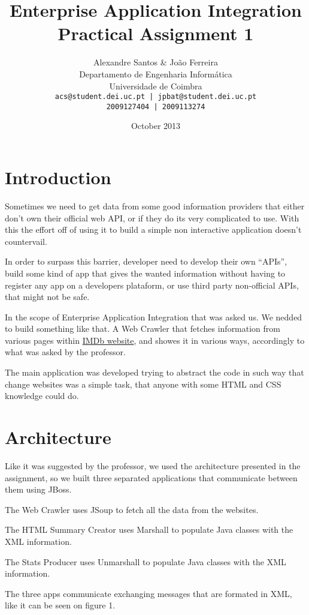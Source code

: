 \documentclass[a4paper]{article}
\title{Enterprise Application Integration \\ Practical Assignment 1}
\author{Alexandre Santos \& João Ferreira\\
		Departamento de Engenharia Informática\\
		Universidade de Coimbra\\
		\texttt{acs@student.dei.uc.pt | jpbat@student.dei.uc.pt}\\
		\texttt{2009127404 | 2009113274}}
\date{October 2013}
\begin{document}
\maketitle

\clearpage

\tableofcontents
\clearpage

\setlength{\parindent}{1cm}
\setlength{\parskip}{0.3cm}

\section{Introduction}
\indent \indent Sometimes we need to get data from some good information providers that either don't own their official web API, or if they do its very complicated to use. With this the effort off of using it to build a simple non interactive application doesn't countervail.

In order to surpass this barrier, developer need to develop their own ``APIs'', build some kind of app that gives the wanted information without having to register any app on a developers plataform, or use third party non-official APIs, that might not be safe.

In the scope of Enterprise Application Integration that was asked us. We nedded to build something like that. A Web Crawler that fetches information from various pages within \href{http://www.imdb.com}{IMDb website}, and showes it in various ways, accordingly to what was asked by the professor.

The main application was developed trying to abstract the code in such way that change websites was a simple task, that anyone with some HTML and CSS knowledge could do.

\section{Architecture}
\indent \indent Like it was suggested by the professor, we used the architecture presented in the assignment, so we built three separated applications that communicate between them using JBoss.

The Web Crawler uses JSoup to fetch all the data from the websites.

The HTML Summary Creator uses Marshall to populate Java classes with the XML information.

The Stats Producer uses Unmarshall to populate Java classes with the XML information.

The three apps communicate exchanging messages that are formated in XML, like it can be seen on figure 1.
\end{document}
